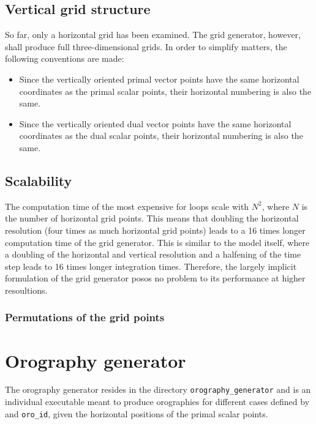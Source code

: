 \documentclass[10pt]{report}
\begin{document}
\section{Vertical grid structure}
\label{sec:vertical_grid_structure}

So far, only a horizontal grid has been examined. The grid generator, however, shall produce full three-dimensional grids. In order to simplify matters, the following conventions are made:
%
\begin{itemize}
\item Since the vertically oriented primal vector points have the same horizontal coordinates as the primal scalar points, their horizontal numbering is also the same.
\item Since the vertically oriented dual vector points have the same horizontal coordinates as the dual scalar points, their horizontal numbering is also the same.
\end{itemize}

\section{Scalability}
\label{sec:scalability}

The computation time of the most expensive for loops scale with $N^2$, where $N$ is the number of horizontal grid points. This means that doubling the horizontal resolution (four times as much horizontal grid points) leads to a 16 times longer computation time of the grid generator. This is similar to the model itself, where a doubling of the horizontal and vertical resolution and a halfening of the time step leads to 16 times longer integration times. Therefore, the largely implicit formulation of the grid generator posos no problem to its performance at higher resoultions.

\subsection{Permutations of the grid points}
\label{sec:permutations_of_the_grid_points}

\chapter{Orography generator}
\label{sec:orography_generator}

The orography generator resides in the directory \texttt{orography\_generator} and is an individual executable meant to produce orographies for different cases defined by and \texttt{oro\_id}, given the horizontal positions of the primal scalar points.
\end{document}
